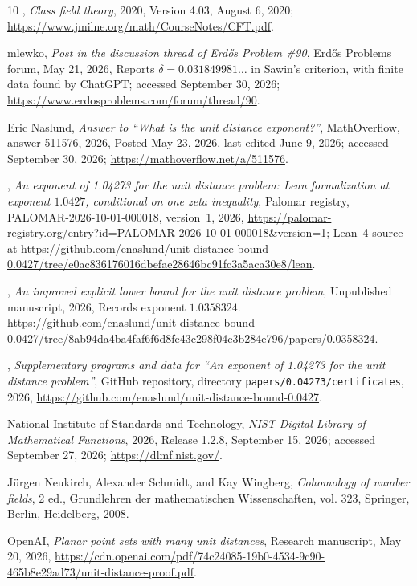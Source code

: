 \documentclass[11pt]{amsart}
\numberwithin{equation}{section}
\theoremstyle{definition}
\theoremstyle{remark}
\begin{document}
\begin{thebibliography}{10}
\bysame, \emph{Class field theory}, 2020, Version 4.03, August 6, 2020;
  \url{https://www.jmilne.org/math/CourseNotes/CFT.pdf}.

{mlewko}, \emph{Post in the discussion thread of {Erd\H{o}s} {P}roblem \#90},
  Erd\H{o}s Problems forum, May 21, 2026, Reports $\delta=0.031849981\ldots$ in
  Sawin's criterion, with finite data found by ChatGPT; accessed September 30,
  2026; \url{https://www.erdosproblems.com/forum/thread/90}.

Eric Naslund, \emph{Answer to ``{W}hat is the unit distance exponent?''},
  MathOverflow, answer 511576, 2026, Posted May 23, 2026, last edited June 9,
  2026; accessed September 30, 2026; \url{https://mathoverflow.net/a/511576}.

\bysame, \emph{An exponent of 1.04273 for the unit distance problem: {L}ean
  formalization at exponent $1.0427$, conditional on one zeta inequality},
  Palomar registry, PALOMAR-2026-10-01-000018, version~1, 2026,
  \url{https://palomar-registry.org/entry?id=PALOMAR-2026-10-01-000018&version=1};
  Lean~4 source at
  \url{https://github.com/enaslund/unit-distance-bound-0.0427/tree/e0ac836176016dbefae28646bc91fc3a5aca30e8/lean}.

\bysame, \emph{An improved explicit lower bound for the unit distance problem},
  Unpublished manuscript, 2026, Records exponent $1.0358324$.
  \url{https://github.com/enaslund/unit-distance-bound-0.0427/tree/8ab94da4ba4faf6f6d8fe43c298f04c3b284e796/papers/0.0358324}.

\bysame, \emph{Supplementary programs and data for ``{A}n exponent of 1.04273
  for the unit distance problem''}, GitHub repository, directory
  \texttt{papers/0.04273/certificates}, 2026,
  \url{https://github.com/enaslund/unit-distance-bound-0.0427}.

{National Institute of Standards and Technology}, \emph{{NIST Digital Library
  of Mathematical Functions}}, 2026, Release 1.2.8, September 15, 2026;
  accessed September 27, 2026; \url{https://dlmf.nist.gov/}.

J{\"u}rgen Neukirch, Alexander Schmidt, and Kay Wingberg, \emph{Cohomology of
  number fields}, 2 ed., Grundlehren der mathematischen Wissenschaften, vol.
  323, Springer, Berlin, Heidelberg, 2008.

{OpenAI}, \emph{Planar point sets with many unit distances}, Research
  manuscript, May 20, 2026,
  \url{https://cdn.openai.com/pdf/74c24085-19b0-4534-9c90-465b8e29ad73/unit-distance-proof.pdf}.


\end{thebibliography}
\end{document}
